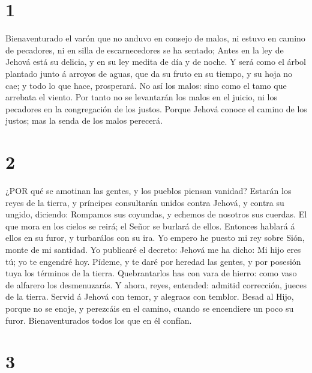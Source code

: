 \hypertarget{section}{%
\section{1}\label{section}}

 Bienaventurado el varón que no anduvo en consejo de malos,
ni estuvo en camino de pecadores, ni en silla de escarnecedores se ha
sentado;  Antes en la ley de Jehová está su delicia, y en su
ley medita de día y de noche.  Y será como el árbol plantado
junto á arroyos de aguas, que da su fruto en su tiempo, y su hoja no
cae; y todo lo que hace, prosperará.  No así los malos: sino
como el tamo que arrebata el viento.  Por tanto no se
levantarán los malos en el juicio, ni los pecadores en la congregación
de los justos.  Porque Jehová conoce el camino de los
justos; mas la senda de los malos perecerá.

\hypertarget{section-1}{%
\section{2}\label{section-1}}

 ¿POR qué se amotinan las gentes, y los pueblos piensan
vanidad?  Estarán los reyes de la tierra, y príncipes
consultarán unidos contra Jehová, y contra su ungido, diciendo:
 Rompamos sus coyundas, y echemos de nosotros sus cuerdas.
 El que mora en los cielos se reirá; el Señor se burlará de
ellos.  Entonces hablará á ellos en su furor, y turbarálos
con su ira.  Yo empero he puesto mi rey sobre Sión, monte de
mi santidad.  Yo publicaré el decreto: Jehová me ha dicho:
Mi hijo eres tú; yo te engendré hoy.  Pídeme, y te daré por
heredad las gentes, y por posesión tuya los términos de la tierra.
 Quebrantarlos has con vara de hierro: como vaso de alfarero
los desmenuzarás.  Y ahora, reyes, entended: admitid
corrección, jueces de la tierra.  Servid á Jehová con
temor, y alegraos con temblor.  Besad al Hijo, porque no se
enoje, y perezcáis en el camino, cuando se encendiere un poco su furor.
Bienaventurados todos los que en él confían.

\hypertarget{section-2}{%
\section{3}\label{section-2}}

